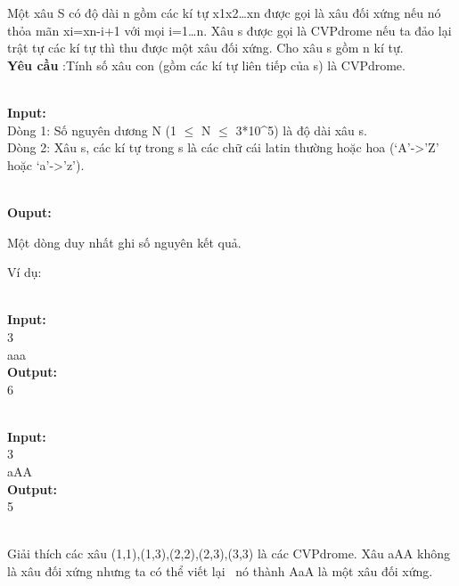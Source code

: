 



   Một xâu S có độ dài n gồm các kí tự x1x2…xn được gọi là xâu đối xứng nếu nó thỏa mãn xi=xn-i+1 với mọi i=1…n. Xâu s được gọi là CVPdrome nếu ta đảo lại trật tự các kí tự thì thu được một xâu đối xứng. Cho xâu s gồm n kí tự.   
\\\textbf{    Yêu cầu   }   :Tính số xâu con (gồm các kí tự liên tiếp của s) là CVPdrome.  


\\\textbf{    Input:   }
\\   Dòng 1: Số nguyên dương N (1 $\le$ N $\le$ 3*10^5) là độ dài xâu s.   
\\   Dòng 2: Xâu s, các kí tự trong s là các chữ cái latin thường hoặc hoa (‘A’->’Z’ hoặc ‘a’->’z’).  


\\\textbf{    Ouput:   }

   Một dòng duy nhất ghi số nguyên kết quả.  

   Ví dụ:  


\\\textbf{    Input:   }
\\   3   
\\   aaa   
\\\textbf{    Output:   }
\\   6  


\\\textbf{    Input:   }
\\   3   
\\   aAA   
\\\textbf{    Output:   }
\\   5  


\\   Giải thích các xâu (1,1),(1,3),(2,2),(2,3),(3,3) là các CVPdrome. Xâu aAA không là xâu đối xứng nhưng ta có thể viết lại  nó thành AaA là một xâu đối xứng.  
